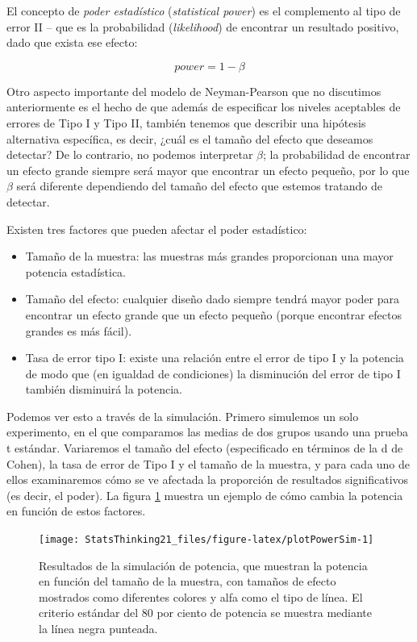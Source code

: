 \documentclass[
  12pt,
]{book}
\providecommand{\tightlist}{%
  \setlength{\itemsep}{0pt}\setlength{\parskip}{0pt}}
\begin{document}
El concepto de \emph{poder estadístico} (\emph{statistical power}) es el complemento al tipo de error II -- que es la probabilidad (\emph{likelihood}) de encontrar un resultado positivo, dado que exista ese efecto:

\[ 
power = 1 - \beta
\]

Otro aspecto importante del modelo de Neyman-Pearson que no discutimos anteriormente es el hecho de que además de especificar los niveles aceptables de errores de Tipo I y Tipo II, también tenemos que describir una hipótesis alternativa específica, es decir, ¿cuál es el tamaño del efecto que deseamos detectar? De lo contrario, no podemos interpretar \(\beta\); la probabilidad de encontrar un efecto grande siempre será mayor que encontrar un efecto pequeño, por lo que \(\beta\) será diferente dependiendo del tamaño del efecto que estemos tratando de detectar.

Existen tres factores que pueden afectar el poder estadístico:

\begin{itemize}
\tightlist
\item
  Tamaño de la muestra: las muestras más grandes proporcionan una mayor potencia estadística.
\item
  Tamaño del efecto: cualquier diseño dado siempre tendrá mayor poder para encontrar un efecto grande que un efecto pequeño (porque encontrar efectos grandes es más fácil).
\item
  Tasa de error tipo I: existe una relación entre el error de tipo I y la potencia de modo que (en igualdad de condiciones) la disminución del error de tipo I también disminuirá la potencia.
\end{itemize}

Podemos ver esto a través de la simulación. Primero simulemos un solo experimento, en el que comparamos las medias de dos grupos usando una prueba t estándar. Variaremos el tamaño del efecto (especificado en términos de la d de Cohen), la tasa de error de Tipo I y el tamaño de la muestra, y para cada uno de ellos examinaremos cómo se ve afectada la proporción de resultados significativos (es decir, el poder). La figura \ref{fig:plotPowerSim} muestra un ejemplo de cómo cambia la potencia en función de estos factores.

\begin{figure}
\texttt{[image: StatsThinking21\_files/figure-latex/plotPowerSim-1]} \caption{Resultados de la simulación de potencia, que muestran la potencia en función del tamaño de la muestra, con tamaños de efecto mostrados como diferentes colores y alfa como el tipo de línea. El criterio estándar del 80 por ciento de potencia se muestra mediante la línea negra punteada.}\label{fig:plotPowerSim}
\end{figure}
\end{document}
